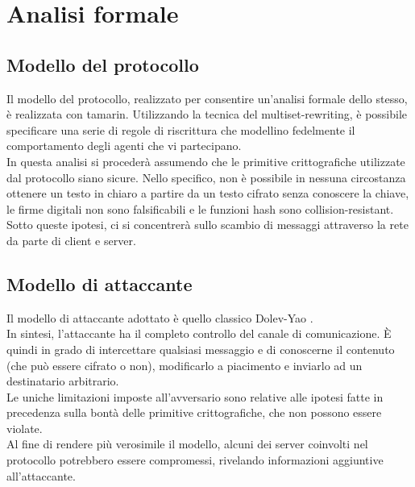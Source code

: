 \section{Analisi formale}

\subsection{Modello del protocollo}
Il modello del protocollo, realizzato per consentire un'analisi formale dello stesso, è realizzata con \gls{tamarin}.
Utilizzando la tecnica del \gls{multiset-rewriting}, è possibile specificare una serie di regole di riscrittura
che modellino fedelmente il comportamento degli agenti che vi partecipano. \\

In questa analisi si procederà assumendo che le primitive crittografiche utilizzate dal protocollo siano sicure.
Nello specifico, non è possibile in nessuna circostanza ottenere un testo in chiaro a partire da un testo cifrato senza conoscere la chiave,
le firme digitali non sono falsificabili e le funzioni hash sono collision-resistant. \\

Sotto queste ipotesi, ci si concentrerà sullo scambio di messaggi attraverso la rete da parte di client e server.

\subsection{Modello di attaccante}
Il modello di attaccante adottato è quello classico Dolev-Yao \cite{art:dolev-yao}. \\
In sintesi, l'attaccante ha il completo controllo del canale di comunicazione.
È quindi in grado di intercettare qualsiasi messaggio e di conoscerne il contenuto (che può essere cifrato o non),
modificarlo a piacimento e inviarlo ad un destinatario arbitrario. \\
Le uniche limitazioni imposte all'avversario sono relative alle ipotesi fatte in precedenza
sulla bontà delle primitive crittografiche, che non possono essere violate. \\

Al fine di rendere più verosimile il modello, alcuni dei server coinvolti nel protocollo potrebbero essere compromessi,
rivelando informazioni aggiuntive all'attaccante.

